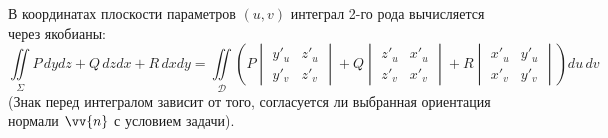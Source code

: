 \documentclass[12pt,a4paper]{article}
\begin{document}
В координатах плоскости параметров $(u, v)$ интеграл 2-го рода вычисляется через якобианы:
$$ \iint\limits_\Sigma P \, dy dz + Q \, dz dx + R \, dx dy = \iint\limits_{\mathscr{D}} \left( P \begin{vmatrix} y'_u & z'_u \\ y'_v & z'_v \end{vmatrix} + Q \begin{vmatrix} z'_u & x'_u \\ z'_v & x'_v \end{vmatrix} + R \begin{vmatrix} x'_u & y'_u \\ x'_v & y'_v \end{vmatrix} \right) du \, dv $$
(Знак перед интегралом зависит от того, согласуется ли выбранная ориентация нормали $\vv{n}$ с условием задачи).
\end{document}
